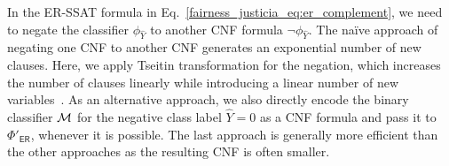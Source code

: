 In the ER-SSAT formula in Eq.~\eqref{fairness_justicia_eq:er_complement}, we need to negate the classifier $ \phi_{\hat{Y}} $ to another CNF formula $ \neg \phi_{\hat{Y}} $. The na\"ive approach of negating one CNF to another CNF generates an exponential number of new clauses. Here, we apply Tseitin transformation for the negation, which increases the number of clauses linearly while introducing a linear number of new variables~\cite{tseitin1983complexity}. As an alternative approach, we also directly encode the binary classifier $\mathcal{M}$ for the negative class label $\hat{Y} = 0$ as a CNF formula and pass it to $\Phi'_{\mathsf{ER}} $, whenever it is possible. The last approach is generally more efficient than the other approaches as the resulting CNF is often smaller.  
\noindent\makebox[\linewidth]{\rule{\paperwidth}{2.5pt}}


